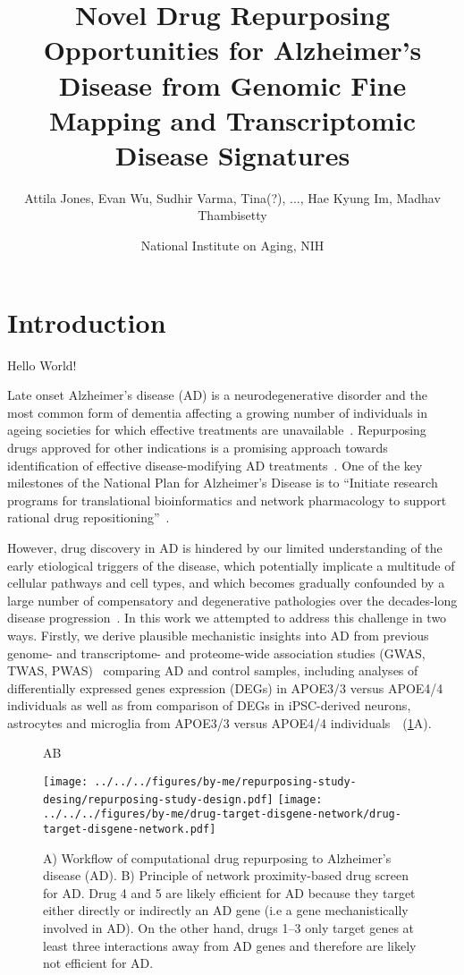 \documentclass[letterpaper]{article}
\title{Novel Drug Repurposing Opportunities for Alzheimer's Disease from
  Genomic Fine Mapping and Transcriptomic Disease Signatures}
\author{Attila Jones, Evan Wu, Sudhir Varma, Tina(?), ..., Hae Kyung Im, Madhav Thambisetty}
\date{National Institute on Aging, NIH}
\begin{document}
\maketitle

\section{Introduction}

Hello World!

Late onset Alzheimer's disease (AD) is a neurodegenerative disorder and the most
common form of dementia affecting a growing number of individuals in ageing
societies for which effective treatments are
unavailable~\citep{Bondi2017,Masters2015}.  Repurposing drugs approved for other indications is
a promising approach  towards identification of effective disease-modifying AD
treatments~\citep{Pushpakom2019,Fang2021,Taubes2021}.  One of the key
milestones of the National Plan for Alzheimer’s Disease is to ``Initiate
research programs for translational bioinformatics and network pharmacology to
support rational drug repositioning''~\citep{Aging}.

However, drug discovery in AD is hindered by our limited understanding of the
early etiological triggers of the disease, which potentially implicate a
multitude of cellular pathways and cell types, and which becomes gradually
confounded by a large number of compensatory and degenerative pathologies over
the decades-long disease progression~\citep{DeStrooper2016}.  In this work we
attempted to address this challenge in two ways.  Firstly, we derive plausible
mechanistic insights into AD from previous genome- and transcriptome- and
proteome-wide association studies (GWAS, TWAS,
PWAS)~\citep{Jansen2019,Kunkle2019,Gerring2020,Baird2021,Schwartzentruber2021,Wightman2021,Wingo2021}
comparing AD and control samples, including analyses of differentially
expressed genes expression (DEGs) in APOE3/3 versus APOE4/4 individuals as
well as from comparison of DEGs in iPSC-derived neurons, astrocytes and
microglia from APOE3/3 versus APOE4/4
individuals~\citep{Taubes2021,Lin2018}~(\ref{fig:workflow}A).

\begin{figure}
\hspace{0.05\textwidth}A\hspace{0.7\textwidth}B

\texttt{[image: ../../../figures/by-me/repurposing-study-desing/repurposing-study-design.pdf]}
\texttt{[image: ../../../figures/by-me/drug-target-disgene-network/drug-target-disgene-network.pdf]}
\caption{
  A) Workflow of computational drug repurposing to Alzheimer's disease (AD).
  B) Principle of network proximity-based drug screen for AD.  Drug 4 and 5
  are likely efficient for AD because they target either directly or
  indirectly an AD gene (i.e a gene mechanistically involved in AD).  On the other
  hand, drugs 1--3 only target genes at least three interactions away from AD
  genes and therefore are likely not efficient for AD.
}
\label{fig:workflow}
\end{figure}
\end{document}
